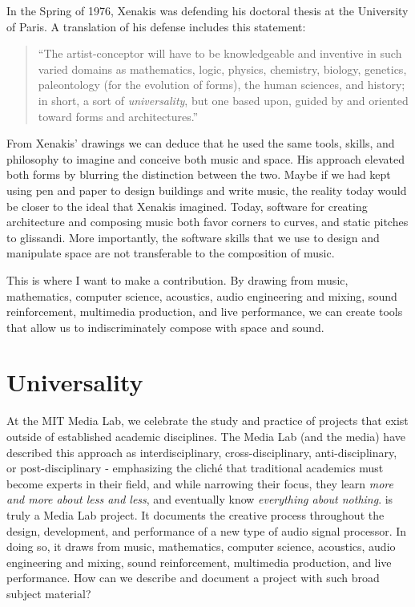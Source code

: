 In the Spring of 1976, Xenakis was defending his doctoral thesis at
the University of Paris. A translation of his defense includes this
statement:
\begin{quotation}
  ``The artist-conceptor will have to be knowledgeable and inventive
  in such varied domains as mathematics, logic, physics, chemistry,
  biology, genetics, paleontology (for the evolution of forms), the
  human sciences, and history; in short, a sort of
  \emph{universality}, but one based upon, guided by and oriented
  toward forms and architectures.'' \cite{russolo1986art}
\end{quotation}
From Xenakis' drawings we can deduce that he used the same tools,
skills, and philosophy to imagine and conceive both music and
space. His approach elevated both forms by blurring the distinction
between the two. Maybe if we had kept using pen and paper to design
buildings and write music, the reality today would be closer to the
ideal that Xenakis imagined. Today, software for creating architecture
and composing music both favor corners to curves, and static pitches
to glissandi. More importantly, the software skills that we use to
design and manipulate space are not transferable to the composition of
music.

This is where I want to make a contribution. By drawing from music,
mathematics, computer science, acoustics, audio engineering and
mixing, sound reinforcement, multimedia production, and live
performance, we can create tools that allow us to indiscriminately
compose with space and sound.

\section{Universality}
\label{sec:universality}

At the MIT Media Lab, we celebrate the study and practice of projects
that exist outside of established academic disciplines. The Media Lab
(and the media) have described this approach as interdisciplinary,
cross-disciplinary, anti-disciplinary, or post-disciplinary -
emphasizing the clich\'{e} that traditional academics must become
experts in their field, and while narrowing their focus, they learn
\textit{more and more about less and less}, and eventually know
\textit{everything about nothing}.  \thesis is truly a Media Lab
project. It documents the creative process throughout the design,
development, and performance of a new type of audio signal
processor. In doing so, it draws from music, mathematics, computer
science, acoustics, audio engineering and mixing, sound reinforcement,
multimedia production, and live performance. How can we describe and
document a project with such broad subject material?  


